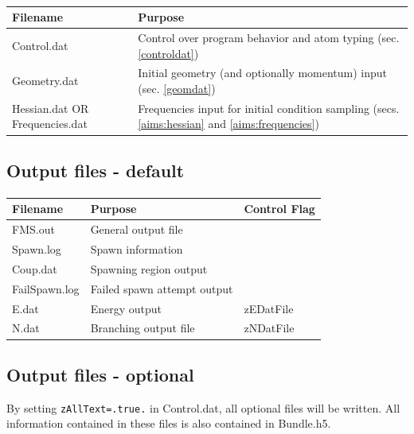 \documentclass[11pt]{article}
\begin{document}
\paragraph{} \begin{tabular}{ | l | p{3 in} | }
\hline
 \textbf{Filename} & \textbf{Purpose} \\ \hline 
 Control.dat & Control over program behavior and atom typing (sec. \ref{controldat}) \\ \hline 
 Geometry.dat & Initial geometry (and optionally momentum) input (sec. \ref{geomdat}) \\ \hline 
 Hessian.dat OR Frequencies.dat & Frequencies input for initial condition sampling (secs. \ref{aims:hessian} and \ref{aims:frequencies}) \\ \hline 
\end{tabular}


\subsection{Output files - default}
\label{defoutfiles} 

\paragraph{} \begin{tabular}{ | l | p{3in} | l | }
\hline
 \textbf{Filename} & \textbf{Purpose} & \textbf{Control Flag} \\ \hline 
 FMS.out & General output file &  \\ \hline 
 Spawn.log & Spawn information &  \\ \hline 
 Coup.dat & Spawning region output &  \\ \hline 
 FailSpawn.log & Failed spawn attempt output &  \\ \hline 
 E.dat & Energy output & zEDatFile \\ \hline 
 N.dat & Branching output file & zNDatFile \\ \hline 
\end{tabular}


\subsection{Output files - optional}
\label{optoutfiles} 

By setting \verb*$zAllText=.true.$ in Control.dat, all optional files will be written. All information contained in these files is also contained in Bundle.h5.
\end{document}

